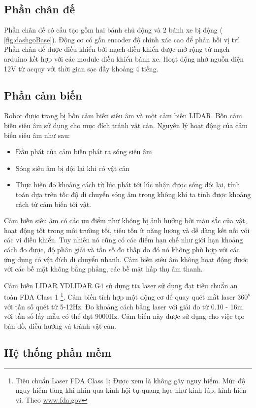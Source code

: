 \subsection{Phần chân đế}
Phần chân đế có cấu tạo gồm hai bánh chủ động và 2 bánh xe bị động (\figurename{ \ref{fig:dashgoBase}}). Động cơ có gắn encoder độ chính xác cao để phản hồi vị trí. Phần chân đế được điều khiển bởi mạch điều khiển được mở rộng từ mạch arduino kết hợp với các module điều khiển bánh xe. Hoạt động nhờ nguồn điện 12V từ acquy với thời gian sạc đầy khoảng 4 tiếng.

\subsection{Phần cảm biến}
Robot được trang bị bốn cảm biến siêu âm và một cảm biến LIDAR. Bốn cảm biến siêu âm sử dụng cho mục đích tránh vật cản. Nguyên lý hoạt động của cảm biến siêu âm như sau:
\begin{itemize}
    \item Đầu phát của cảm biến phát ra sóng siêu âm
    \item Sóng siêu âm bị dội lại khi có vật cản
    \item Thực hiện đo khoảng cách từ lúc phát tới lúc nhận được sóng dội lại, tính toán dựa trên tốc độ di chuyển sóng âm trong không khí ta tính được khoảng cách từ cảm biến tới vật.
\end{itemize}
Cảm biến siêu âm có các ưu điểm như không bị ảnh hưởng bởi màu sắc của vật, hoạt động tốt trong môi trường tối, tiêu tốn ít năng lượng và dễ dàng kết nối với các vi điều khiển. Tuy nhiên nó cũng có các điểm hạn chế như giới hạn khoảng cách đo được, độ phân giải và tần số đo thấp do đó nó không phù hợp với các ứng dụng có vật đích di chuyển nhanh. Cảm biến siêu âm không hoạt động được với các bề mặt không bằng phẳng, các bề mặt hấp thụ âm thanh.

Cảm biến LIDAR YDLIDAR G4 sử dụng tia laser sử dụng đạt tiêu chuẩn an toàn FDA Class 1 \footnote{Tiêu chuẩn Laser FDA Class 1: Được xem là không gây nguy hiểm. Mức độ nguy hiểm tăng khi nhìn qua kính hội tụ quang học như kính lúp, kính hiển vi. Theo \url{www.fda.gov}}.
Cảm biến tích hợp một động cơ để quay quét mắt laser ${360}^{o}$ với tần số quét từ 5-12Hz. Đo khoảng cách bằng laser với giải đo từ 0.10 - 16m với tần số lấy mẫu có thể đạt 9000Hz.
Cảm biến này được sử dụng cho việc tạo bản đồ, điều hướng và tránh vật cản.


\subsection{Hệ thống phần mềm}

